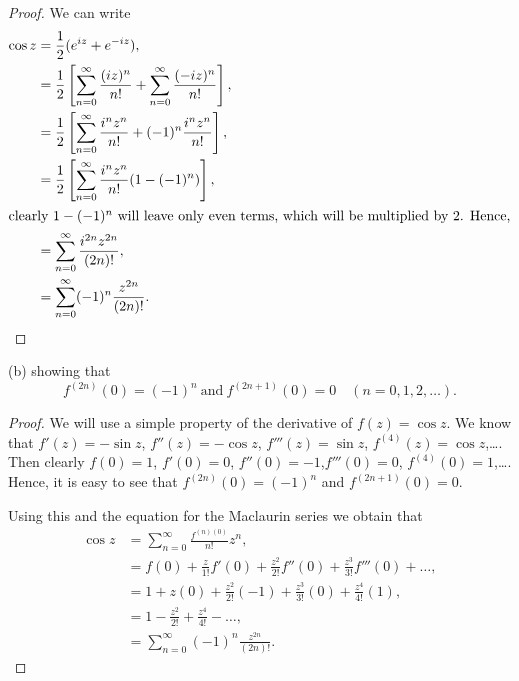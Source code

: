 \documentclass{article}
\begin{document}
\begin{proof}
    We can write
    \begin{align*}
        \cos z & = \frac{1}{2} (e^{iz} + e^{-iz}),                                      \\
               & = \frac{1}{2} \left[\sum_{n=0}^\infty \frac{(iz)^n}{n!} +
        \sum_{n=0}^\infty \frac{(-iz)^n}{n!}\right],                                    \\
               & =\frac{1}{2}\left[\sum_{n=0}^\infty \frac{i^nz^n}{n!} +
        (-1)^n\frac{i^nz^n}{n!} \right],                                                \\
               & =\frac{1}{2}\left[\sum_{n=0}^\infty\frac{i^nz^n}{n!}(1-(-1)^n)\right], \\
        \intertext{clearly $1 - (-1)^n$ will leave only even terms, which will
            be multiplied by $2$. Hence,}
               & =\sum_{n=0}^\infty \frac{i^{2n}z^{2n}}{(2n)!},                         \\
               & = \sum_{n=0}^\infty (-1)^n \frac{z^{2n}}{(2n)!}.
    \end{align*}
\end{proof}

(b) showing that
\begin{equation*}
    f^{(2n)}(0) = (-1)^n \ \text{and} \ f^{(2n+1)}(0) = 0 \quad (n = 0,1,2,\dots).
\end{equation*}

\begin{proof}
    We will use a simple property of the derivative of $f(z) = \cos z$. We know
    that $f'(z) = -\sin z$, $f''(z) = -\cos z$, $f'''(z) = \sin z$,
    $f^{(4)}(z) = \cos z$,\dots. Then clearly
    $f(0) = 1$, $f'(0) = 0$, $f''(0)=-1$,$f'''(0) = 0$, $f^{(4)}(0) = 1$,\dots.
    Hence, it is easy to see that $f^{(2n)}(0)=(-1)^n$ and $f^{(2n+1)}(0) = 0$.

    Using this and the equation for the Maclaurin series we obtain that
    \begin{align*}
        \cos z & = \sum_{n=0}^\infty \frac{f^{(n)(0)}}{n!}z^n,                            \\
               & = f(0) + \frac{z}{1!}f'(0) + \frac{z^2}{2!}f''(0) +
        \frac{z^3}{3!}f'''(0) + \dots,                                                    \\
               & = 1 + z(0) + \frac{z^2}{2!}(-1) + \frac{z^3}{3!}(0) + \frac{z^4}{4!}(1), \\
               & = 1 - \frac{z^2}{2!} + \frac{z^4}{4!}-\dots,                             \\
               & =  \sum_{n=0}^\infty (-1)^n\frac{z^{2n}}{(2n)!}.
    \end{align*}
\end{proof}
\end{document}
